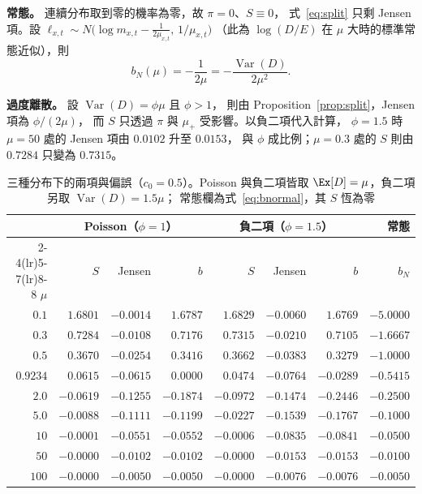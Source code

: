 \textbf{常態。} 連續分布取到零的機率為零，故 $\pi=0$、$S\equiv0$，
式~\eqref{eq:split} 只剩 Jensen 項。設
$\ell_{x,t}\sim N\!\big(\log m_{x,t}-\tfrac{1}{2\mu_{x,t}},\,1/\mu_{x,t}\big)$
（此為 $\log(D/E)$ 在 $\mu$ 大時的標準常態近似），則
\begin{equation}\label{eq:bnormal}
b_N(\mu)=-\frac{1}{2\mu}=-\frac{\operatorname{Var}(D)}{2\mu^{2}} .
\end{equation}

\textbf{過度離散。} 設 $\operatorname{Var}(D)=\phi\mu$ 且 $\phi>1$，
則由 Proposition~\ref{prop:split}，Jensen 項為 $\phi/(2\mu)$，
而 $S$ 只透過 $\pi$ 與 $\mu_{+}$ 受影響。以負二項代入計算，
$\phi=1.5$ 時 $\mu=50$ 處的 Jensen 項由 $0.0102$ 升至 $0.0153$，
與 $\phi$ 成比例；$\mu=0.3$ 處的 $S$ 則由 $0.7284$ 只變為 $0.7315$。

\begin{table}[H]
\centering
\caption{三種分布下的兩項與偏誤（$c_0=0.5$）。Poisson 與負二項皆取
$\Ex[D]=\mu$，負二項另取 $\operatorname{Var}(D)=1.5\mu$；
常態欄為式~\eqref{eq:bnormal}，其 $S$ 恆為零}
\footnotesize
\begin{tabular}{rrrrrrrr}
\toprule
 & \multicolumn{3}{c}{Poisson（$\phi=1$）} & \multicolumn{3}{c}{負二項（$\phi=1.5$）} & 常態\\
\cmidrule(lr){2-4}\cmidrule(lr){5-7}\cmidrule(lr){8-8}
$\mu$ & $S$ & Jensen & $b$ & $S$ & Jensen & $b$ & $b_N$\\
\midrule
$0.1$   & $1.6801$  & $-0.0014$ & $1.6787$  & $1.6829$  & $-0.0060$ & $1.6769$  & $-5.0000$\\
$0.3$   & $0.7284$  & $-0.0108$ & $0.7176$  & $0.7315$  & $-0.0210$ & $0.7105$  & $-1.6667$\\
$0.5$   & $0.3670$  & $-0.0254$ & $0.3416$  & $0.3662$  & $-0.0383$ & $0.3279$  & $-1.0000$\\
$0.9234$& $0.0615$  & $-0.0615$ & $0.0000$  & $0.0474$  & $-0.0764$ & $-0.0289$ & $-0.5415$\\
$2.0$   & $-0.0619$ & $-0.1255$ & $-0.1874$ & $-0.0972$ & $-0.1474$ & $-0.2446$ & $-0.2500$\\
$5.0$   & $-0.0088$ & $-0.1111$ & $-0.1199$ & $-0.0227$ & $-0.1539$ & $-0.1767$ & $-0.1000$\\
$10$    & $-0.0001$ & $-0.0551$ & $-0.0552$ & $-0.0006$ & $-0.0835$ & $-0.0841$ & $-0.0500$\\
$50$    & $-0.0000$ & $-0.0102$ & $-0.0102$ & $-0.0000$ & $-0.0153$ & $-0.0153$ & $-0.0100$\\
$100$   & $-0.0000$ & $-0.0050$ & $-0.0050$ & $-0.0000$ & $-0.0076$ & $-0.0076$ & $-0.0050$\\
\bottomrule
\end{tabular}
\label{tab:normal}
\end{table}

